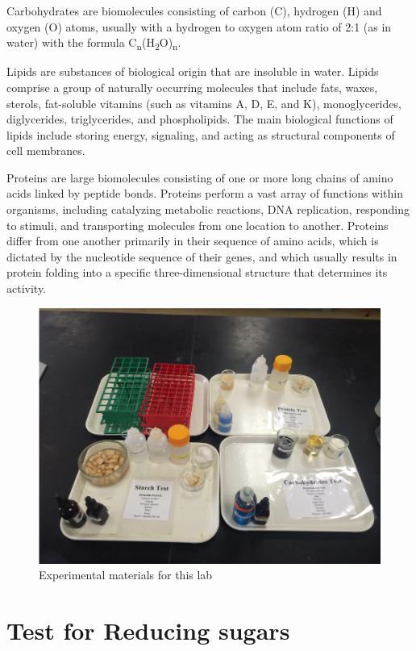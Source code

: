 Carbohydrates are biomolecules consisting of carbon (C), hydrogen (H)
and oxygen (O) atoms, usually with a hydrogen to oxygen atom ratio of
2:1 (as in water) with the formula
C\textsubscript{n}(H\textsubscript{2}O)\textsubscript{n}.

Lipids are substances of biological origin that are insoluble in water.
Lipids comprise a group of naturally occurring molecules that include
fats, waxes, sterols, fat-soluble vitamins (such as vitamins A, D, E,
and K), monoglycerides, diglycerides, triglycerides, and phospholipids.
The main biological functions of lipids include storing energy,
signaling, and acting as structural components of cell membranes.

Proteins are large biomolecules consisting of one or more long chains of
amino acids linked by peptide bonds. Proteins perform a vast array of
functions within organisms, including catalyzing metabolic reactions,
DNA replication, responding to stimuli, and transporting molecules from
one location to another. Proteins differ from one another primarily in
their sequence of amino acids, which is dictated by the nucleotide
sequence of their genes, and which usually results in protein folding
into a specific three-dimensional structure that determines its
activity.

\begin{figure}

{\centering \includegraphics[width=0.7\linewidth]{./figures/chem_aspects/Setup}

}

\caption{Experimental materials for this lab}\label{fig:setup}
\end{figure}

\section{Test for Reducing sugars}\label{test-for-reducing-sugars}

